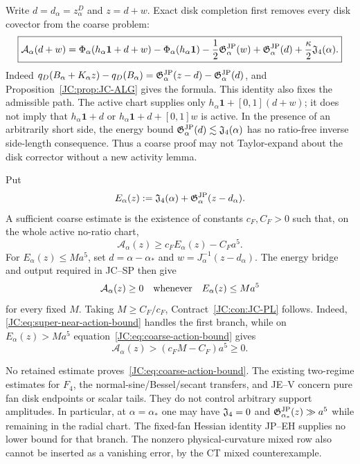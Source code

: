 \begin{contract}
\label{JC:con:JC-CL}
Write $d=d_\alpha=z_\alpha^D$ and $z=d+w$.  Exact disk completion first
removes every disk covector from the coarse problem:
\begin{equation}\label{JC:eq:coarse-action-normal-form}
 \boxed{
 \mathscr A_\alpha(d+w)=
 \Phi_\alpha(h_\alpha\mathbf1+d+w)
 -\Phi_\alpha(h_\alpha\mathbf1)
 -\frac12\Gjp_\alpha(w)+\Gjp_\alpha(d)
 +\frac\kappa2\Jfour(\alpha).}
\end{equation}
Indeed
$q_D(B_\alpha+K_\alpha z)-q_D(B_\alpha)
=\Gjp_\alpha(z-d)-\Gjp_\alpha(d)$, and
Proposition~\ref{JC:prop:JC-ALG} gives the formula.  This identity also fixes
the admissible path.  The active chart supplies only
$h_\alpha\mathbf1+[0,1](d+w)$; it does not imply that
$h_\alpha\mathbf1+d$ or
$h_\alpha\mathbf1+d+[0,1]w$ is active.  In the presence of an arbitrarily
short side, the energy bound $\Gjp_\alpha(d)\lesssim\Jfour(\alpha)$ has no
ratio-free inverse side-length consequence.  Thus a coarse proof may not
Taylor-expand about the disk corrector without a new activity lemma.

Put
\begin{equation}\label{JC:eq:coarse-action-energy}
 E_\alpha(z):=\Jfour(\alpha)
 +\Gjp_\alpha(z-d_\alpha).
\end{equation}
A sufficient coarse estimate is the existence of constants
$c_F,C_F>0$ such that, on the whole active no-ratio chart,
\begin{equation}\label{JC:eq:coarse-action-bound}
 \boxed{
 \mathscr A_\alpha(z)
 \ge c_FE_\alpha(z)-C_Fa^5.}
\end{equation}
For $E_\alpha(z)\le Ma^5$, set
$d=\alpha-\alpha_*$ and
$w=J_\alpha^{-1}(z-d_\alpha)$.  The energy bridge and output required in
JC--SP then give
\begin{equation}\label{JC:eq:super-near-action-bound}
 \mathscr A_\alpha(z)\ge0
 \quad\hbox{whenever}\quad
 E_\alpha(z)\le Ma^5
\end{equation}
for every fixed $M$.  Taking $M\ge C_F/c_F$, Contract~\ref{JC:con:JC-PL}
follows.  Indeed,
\eqref{JC:eq:super-near-action-bound} handles the first branch, while on
$E_\alpha(z)>Ma^5$ equation~\eqref{JC:eq:coarse-action-bound} gives
\[
 \mathscr A_\alpha(z)
 >(c_FM-C_F)a^5\ge0.
\]

No retained estimate proves~\eqref{JC:eq:coarse-action-bound}.  The existing
two-regime estimates for $F_4$, the normal-sine/Bessel/secant transfers,
and JE--V concern pure fan disk endpoints or scalar tails.  They do not
control arbitrary support amplitudes.  In particular, at
$\alpha=\alpha_*$ one may have
$\Jfour=0$ and $\Gjp_{\alpha_*}(z)\gg a^5$ while remaining in the radial
chart.  The fixed-fan Hessian identity JP--EH supplies no lower bound for
that branch.  The nonzero physical-curvature mixed row also cannot be
inserted as a vanishing error, by the CT mixed counterexample.


\end{contract}
